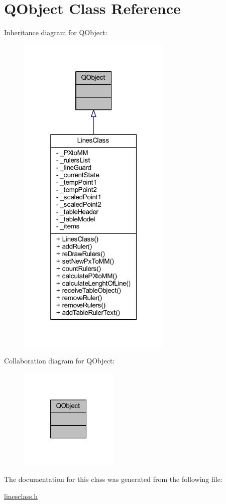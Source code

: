 \hypertarget{class_q_object}{}\section{Q\+Object Class Reference}
\label{class_q_object}


Inheritance diagram for Q\+Object\+:
\nopagebreak
\begin{figure}[H]
\begin{center}
\leavevmode
\includegraphics[width=208pt]{class_q_object__inherit__graph}
\end{center}
\end{figure}


Collaboration diagram for Q\+Object\+:\nopagebreak
\begin{figure}[H]
\begin{center}
\leavevmode
\includegraphics[width=133pt]{class_q_object__coll__graph}
\end{center}
\end{figure}


The documentation for this class was generated from the following file\+:\begin{DoxyCompactItemize}
\item 
\mbox{\hyperlink{linesclass_8h}{linesclass.\+h}}\end{DoxyCompactItemize}

